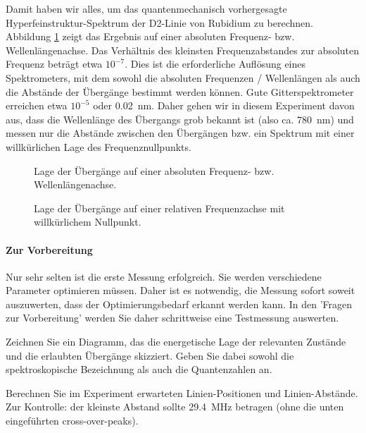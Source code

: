 Damit haben wir alles, um das quantenmechanisch vorhergesagte Hyperfeinstruktur-Spektrum der D2-Linie von Rubidium zu berechnen. Abbildung \ref{sim_spectra} zeigt das Ergebnis auf einer absoluten Frequenz- bzw. Wellenlängenachse. Das Verhältnis des kleinsten Frequenzabstandes zur absoluten Frequenz beträgt etwa $10^{-7}$. Dies ist die erforderliche Auflösung eines Spektrometers, mit dem sowohl die absoluten Frequenzen / Wellenlängen als auch die Abstände der Übergänge bestimmt werden können. Gute Gitterspektrometer erreichen etwa $10^{-5}$ oder 0.02~nm. Daher gehen wir in diesem Experiment davon aus, dass die Wellenlänge des Übergangs grob bekannt ist (also ca. 780~nm) und messen nur die Abstände zwischen den Übergängen bzw. ein Spektrum mit einer willkürlichen Lage des Frequenznullpunkts.


\begin{figure}

 \vspace*{5mm}

	\caption{Lage der Übergänge auf einer absoluten Frequenz- bzw. Wellenlängenachse.}
	\label{sim_spectra}
\end{figure}




\begin{figure}

	\caption{Lage der Übergänge auf einer relativen Frequenzachse mit willkürlichem Nullpunkt.}
	\label{sim_spectra_null}
\end{figure}


\paragraph*{Zur Vorbereitung}  Nur sehr selten ist die erste Messung erfolgreich. Sie werden verschiedene Parameter optimieren müssen. Daher ist es notwendig, die Messung sofort soweit auszuwerten, dass der Optimierungsbedarf erkannt werden kann.  In den 'Fragen zur Vorbereitung' werden Sie daher schrittweise eine Testmessung auswerten.

\begin{questions}
	\item Zeichnen Sie ein Diagramm, das die energetische Lage der relevanten Zustände und die erlaubten Übergänge skizziert. Geben Sie dabei sowohl die spektroskopische Bezeichnung als auch die Quantenzahlen an.
	\item Berechnen Sie im Experiment erwarteten Linien-Positionen und Linien-Abstände. Zur Kontrolle: der kleinste Abstand sollte 29.4~MHz betragen (ohne die unten eingeführten cross-over-peaks). \label{frage:peaks}
\end{questions}
	

